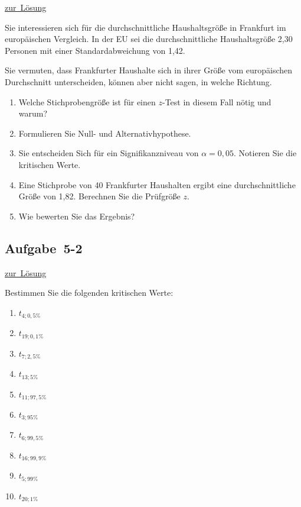 \documentclass[
  11pt,
  ngerman,
  a4paper,
]{report}
\providecommand{\tightlist}{%
  \setlength{\itemsep}{0pt}\setlength{\parskip}{0pt}}
\begin{document}
\protect\hyperlink{loesung-5-1}{zur~Lösung}

Sie interessieren sich für die durchschnittliche Haushaltsgröße in Frankfurt im europäischen Vergleich. In der EU sei die durchschnittliche Haushaltsgröße 2,30 Personen mit einer Standardabweichung von 1,42.

Sie vermuten, dass Frankfurter Haushalte sich in ihrer Größe vom europäischen Durchschnitt unterscheiden, können aber nicht sagen, in welche Richtung.

\begin{enumerate}
\def\labelenumi{\alph{enumi})}
\tightlist
\item
  Welche Stichprobengröße ist für einen \(z\)-Test in diesem Fall nötig und warum?
\item
  Formulieren Sie Null- und Alternativhypothese.
\item
  Sie entscheiden Sich für ein Signifikanzniveau von \(\alpha=0{,}05\). Notieren Sie die kritischen Werte.
\item
  Eine Stichprobe von 40 Frankfurter Haushalten ergibt eine durchschnittliche Größe von 1,82. Berechnen Sie die Prüfgröße \(z\).
\item
  Wie bewerten Sie das Ergebnis?
\end{enumerate}

\hypertarget{aufgabe-5-2}{%
\subsection{Aufgabe~5-2}\label{aufgabe-5-2}}

\protect\hyperlink{loesung-5-2}{zur~Lösung}

Bestimmen Sie die folgenden kritischen Werte:

\begin{enumerate}
\def\labelenumi{\alph{enumi})}
\tightlist
\item
  \(t_{4;0{,}5\%}\)
\item
  \(t_{19;0{,}1\%}\)
\item
  \(t_{7;2{,}5\%}\)
\item
  \(t_{13;5\%}\)
\item
  \(t_{11;97{,}5\%}\)
\item
  \(t_{3;95\%}\)
\item
  \(t_{6;99{,}5\%}\)
\item
  \(t_{16;99{,}9\%}\)
\item
  \(t_{5;99\%}\)
\item
  \(t_{20;1\%}\)
\end{enumerate}
\end{document}
